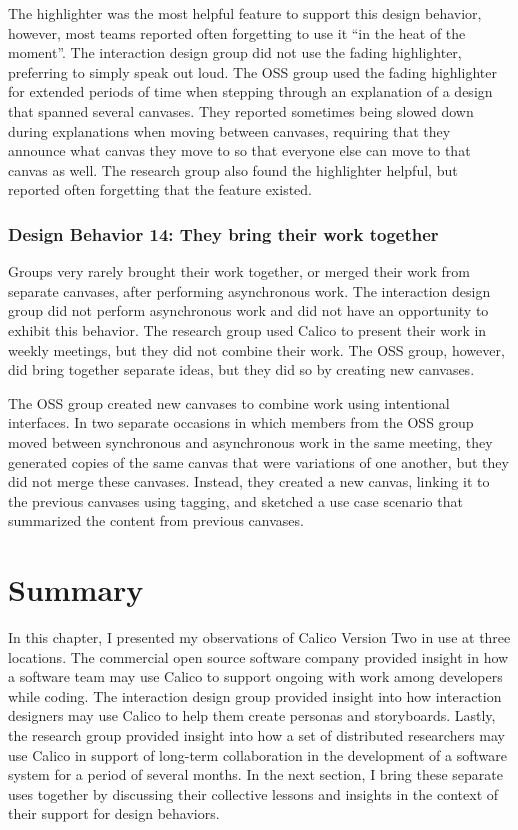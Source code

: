 The highlighter was the most helpful feature to support this design behavior, however, most teams reported often forgetting to use it ``in the heat of the moment''. The interaction design group did not use the fading highlighter, preferring to simply speak out loud. The OSS group used the fading highlighter for extended periods of time when stepping through an explanation of a design that spanned several canvases. They reported sometimes being slowed down during explanations when moving between canvases, requiring that they announce what canvas they move to so that everyone else can move to that canvas as well. The research group also found the highlighter helpful, but reported often forgetting that the feature existed.

\subsubsection{Design Behavior 14: They bring their work together}

Groups very rarely brought their work together, or merged their work from separate canvases, after performing asynchronous work. The interaction design group did not perform asynchronous work and did not have an opportunity to exhibit this behavior. The research group used Calico to present their work in weekly meetings, but they did not combine their work. The OSS group, however, did bring together separate ideas, but they did so by creating new canvases. 

The OSS group created new canvases to combine work using intentional interfaces. In two separate occasions in which members from the OSS group moved between synchronous and asynchronous work in the same meeting, they generated copies of the same canvas that were variations of one another, but they did not merge these canvases. Instead, they created a new canvas, linking it to the previous canvases using tagging, and sketched a use case scenario that summarized the content from previous canvases. 


\section{Summary}
\label{chapter:evaluation:summary}

In this chapter, I presented my observations of Calico Version Two in use at three locations. The commercial open source software company provided insight in how a software team may use Calico to support ongoing with work among developers while coding. The interaction design group provided insight into how interaction designers may use Calico to help them create personas and storyboards. Lastly, the research group provided insight into how a set of distributed researchers may use Calico in support of long-term collaboration in the development of a software system for a period of several months. In the next section, I bring these separate uses together by discussing their collective lessons and insights in the context of their support for design behaviors.

